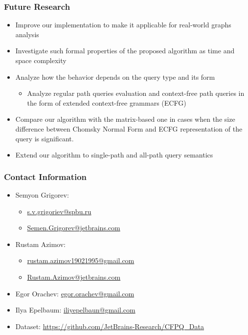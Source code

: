 \documentclass[xcolor=table]{beamer}
\begin{document}
\begin{frame}[fragile] \frametitle{Future Research}
  \begin{itemize}
  	\item Improve our implementation to make it applicable for real-world graphs analysis
  	\pause
  	\item Investigate such formal properties of the proposed algorithm as time and space complexity
  	\pause
  	\item Analyze how the behavior depends on the query type and its form
  	\begin{itemize}
  		\item Analyze regular path queries evaluation and context-free path queries in the form
  		of extended context-free grammars (ECFG)
  	\end{itemize}
  	\pause	
    \item Compare our algorithm with the matrix-based one
    in cases when the size difference between Chomsky Normal Form and ECFG
    representation of the query is significant.
    \pause
    \item Extend our algorithm to single-path and all-path
    query semantics
\end{itemize}
\end{frame}

\begin{frame}
\frametitle{Contact Information}
\begin{itemize}
  \item Semyon Grigorev:
    \begin{itemize}
      \item \href{mailto:s.v.grigoriev@spbu.ru}{s.v.grigoriev@spbu.ru}
      \item \href{mailto:Semen.Grigorev@jetbrains.com}{Semen.Grigorev@jetbrains.com}
    \end{itemize}
  \item Rustam Azimov:
  \begin{itemize}
  	\item \href{mailto:rustam.azimov19021995@gmail.com}{rustam.azimov19021995@gmail.com}
  	\item \href{mailto:Rustam.Azimov@jetbrains.com}{Rustam.Azimov@jetbrains.com}
  \end{itemize}
  \item Egor Orachev: \href{mailto:egor.orachev@gmail.com}{egor.orachev@gmail.com}
  \item Ilya Epelbaum: \href{mailto:iliyepelbaun@gmail.com}{iliyepelbaun@gmail.com}
\vspace{0.5cm}
  \item Dataset: \href{https://github.com/JetBrains-Research/CFPQ_Data}{https://github.com/JetBrains-Research/CFPQ\_Data}
\end{itemize}
\vspace{0.1cm}
\end{frame}
\end{document}
